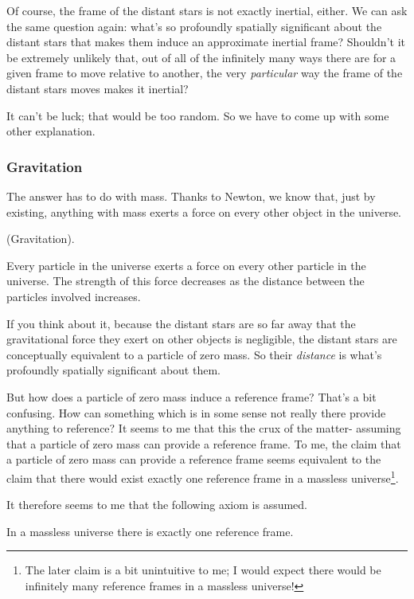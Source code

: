 \documentclass{article}
\begin{document}
Of course, the frame of the distant stars is not exactly inertial, either. We can ask the same question again: what's so profoundly spatially significant about the distant stars that makes them induce an approximate inertial frame? Shouldn't it be extremely unlikely that, out of all of the infinitely many ways there are for a given frame to move relative to another, the very \textit{particular} way the frame of the distant stars moves makes it inertial?

It can't be luck; that would be too random. So we have to come up with some other explanation.

\subsubsection*{Gravitation}

The answer has to do with mass. Thanks to Newton, we know that, just by existing, anything with mass exerts a force on every other object in the universe.

\begin{axiom}
	(Gravitation).
	
	Every particle in the universe exerts a force on every other particle in the universe. The strength of this force decreases as the distance between the particles involved increases.
\end{axiom}

If you think about it, because the distant stars are so far away that the gravitational force they exert on other objects is negligible, the distant stars are conceptually equivalent to a particle of zero mass. So their \textit{distance} is what's profoundly spatially significant about them.

But how does a particle of zero mass induce a reference frame? That's a bit confusing. How can something which is in some sense not really there provide anything to reference? It seems to me that this the crux of the matter- assuming that a particle of zero mass can provide a reference frame. To me, the claim that a particle of zero mass can provide a reference frame seems equivalent to the claim that there would exist exactly one reference frame in a massless universe\footnote{The later claim is a bit unintuitive to me; I would expect there would be infinitely many reference frames in a massless universe!}.

It therefore seems to me that the following axiom is assumed.

\begin{axiom}
	In a massless universe there is exactly one reference frame.
\end{axiom}
\end{document}
